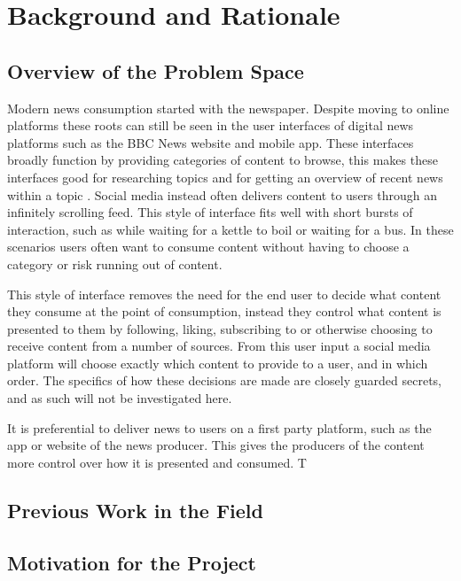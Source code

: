 \documentclass[12pt,titlepage]{article}
\begin{document}
\section{Background and Rationale}

  \subsection{Overview of the Problem Space}

  Modern news consumption started with the newspaper. Despite moving to online
  platforms these roots can still be seen in the user interfaces of digital news
  platforms such as the BBC News website and mobile app. These interfaces
  broadly function by providing categories of content to browse, this makes
  these interfaces good for researching topics and for getting an overview of
  recent news within a topic \cite{dummy}. Social media instead often delivers
  content to users through an infinitely scrolling feed. This style of interface
  fits well with short bursts of interaction, such as while waiting for a kettle
  to boil or waiting for a bus. In these scenarios users often want to consume
  content without having to choose a category or risk running out of content.

  This style of interface removes the need for the end user to decide what
  content they consume at the point of consumption, instead they control what
  content is presented to them by following, liking, subscribing to or otherwise
  choosing to receive content from a number of sources. From this user input a
  social media platform will choose exactly which content to provide to a user,
  and in which order. The specifics of how these decisions are made are closely
  guarded secrets, and as such will not be investigated here.

  It is preferential to deliver news to users on a first party platform, such as
  the app or website of the news producer. This gives the producers of the
  content more control over how it is presented and consumed. T

  \subsection{Previous Work in the Field}

  \subsection{Motivation for the Project}
\end{document}
